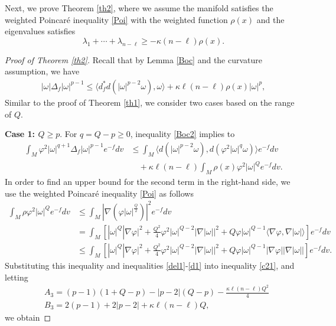 \documentclass[leqno,12pt]{article} %
\theoremstyle{plain} %
\theoremstyle{definition} %
\numberwithin{equation}{section}
\begin{document}
Next, we prove Theorem \ref{th2}, where we assume the manifold satisfies the weighted Poincar\'e inequality \eqref{Poi} with the weighted function $\rho(x)$ and the eigenvalues satisfies $$\lambda_1+\cdots+\lambda_{n-\ell}\ge -\kappa(n-\ell)\rho(x).$$	
\begin{proof}[Proof of Theorem \ref{th2}]
	Recall that by Lemma \ref{Boc} and the curvature assumption, we have
	\begin{align} \label{Boc2}
		|\omega| \Delta_f |\omega|^{p-1} \le \langle d^*_f d (|\omega|^{p-2}\omega), \omega \rangle +\kappa \ell (n-\ell) \rho(x)|\omega|^p,
	\end{align}
	Similar to the proof of Theorem \ref{th1}, we consider two cases based on the range of $Q$.
	
	\textbf{Case 1: $Q \ge p$}.  For $q=Q-p\ge 0$,	inequality \eqref{Boc2} implies to
	\begin{align} \label{c21}\nonumber
		\int_M \varphi ^2|\omega |^{q+1} \Delta_f |\omega |^{p-1}e^{-f} dv &\le 
		\int_M \langle d(|\omega|^{p-2}\omega),d(\varphi^2 |\omega|^q\omega) \rangle e^{-f}dv\\
	&	\quad+\kappa\ell(n-\ell)\int_M \rho(x)\varphi^2 |\omega
		|^{Q}e^{-f}dv.		
	\end{align}
	In order to find an upper bound for the second term in the right-hand side, we use the weighted Poincar\'e inequality \eqref{Poi} as follows
	\begin{align*}
		\int_M \rho\varphi^2 |\omega
		|^{Q}e^{-f}dv&\le   \int_M \left| \nabla \left( \varphi |\omega|^{\frac{Q}{2}} \right) \right|^2 e^{-f}dv\\ \nonumber
		&=  \int_M \left[|\omega {|^{Q}}|\nabla \varphi {|^2}  + 
		\frac{Q^2 }{4}{\varphi ^2}|\omega|^{Q-2} |\nabla |\omega |{|^2}+ 
		Q {\varphi |\omega |^{Q-1} \langle \nabla \varphi ,\nabla |\omega | \rangle }\right]e^{-f}dv\\
		&\le  \int_M \left[|\omega {|^{Q}}|\nabla \varphi {|^2}  + 
		\frac{Q^2 }{4}{\varphi ^2}|\omega|^{Q-2} |\nabla |\omega |{|^2}+ 
		Q {\varphi |\omega |^{Q-1} | \nabla \varphi| |\nabla |\omega || }\right]e^{-f}dv.	
	\end{align*}
	Substituting this inequality and inequalities \eqref{del1}-\eqref{d1} into inequality \eqref{c21}, and letting 
		\begin{align*}
		&A_3=(p-1)(1+Q-p)-|p-2|(Q-p)-\frac{\kappa \ell (n-\ell)Q^2}{4}\\
		&B_3=2(p-1)+2|p-2|+\kappa \ell (n-\ell)Q,
	\end{align*}
	we obtain

\end{proof}
\end{document}
